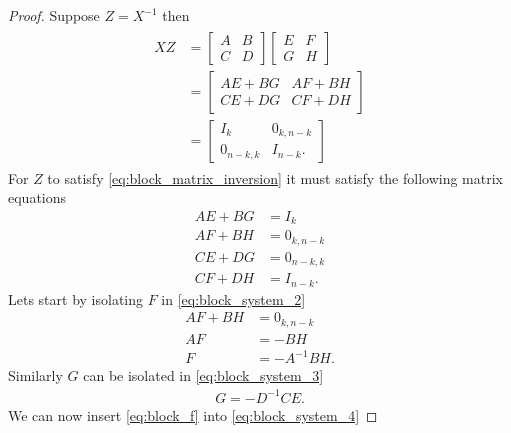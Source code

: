 \begin{proof}
    Suppose $Z = X^{-1}$ then
    \begin{align}
        \begin{split}
            XZ &=
            \begin{bmatrix}
                A & B \\
                C & D
            \end{bmatrix}
            \begin{bmatrix}
                E & F \\
                G & H
            \end{bmatrix} \\
            &=
            \begin{bmatrix}
                AE + BG & AF + BH \\
                CE + DG & CF + DH
            \end{bmatrix} \\
            &=
            \begin{bmatrix}
                I_k & 0_{k,n-k} \\
                0_{n-k,k} & I_{n-k}.
            \end{bmatrix}
            \label{eq:block_matrix_inversion}
        \end{split}
    \end{align}
    For $Z$ to satisfy \eqref{eq:block_matrix_inversion} it must satisfy the following matrix equations
    \begin{align}
        AE + BG &= I_k \label{eq:block_system_1} \\
        AF + BH &= 0_{k,n-k} \label{eq:block_system_2} \\
        CE + DG &= 0_{n-k,k} \label{eq:block_system_3} \\
        CF + DH &= I_{n-k}. \label{eq:block_system_4}
    \end{align}
    Lets start by isolating $F$ in \eqref{eq:block_system_2}
    \begin{align}
        AF + BH &= 0_{k,n-k} \nonumber \\
        AF &= - BH \nonumber \\
        F &= -A^{-1}BH. \label{eq:block_f}
    \end{align}
    Similarly $G$ can be isolated in \eqref{eq:block_system_3}
    \begin{align}
        G = -D^{-1}CE. \label{eq:block_g}
    \end{align}
    We can now insert \eqref{eq:block_f} into  \eqref{eq:block_system_4}

\end{proof}
